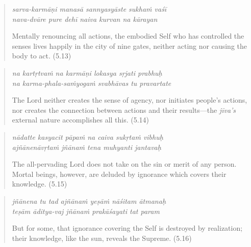 \documentclass[12pt, twoside, openright]{memoir}
\begin{document}
\par
\begin{verse}
\textit{sarva-karmāṇi manasā sannyasyāste sukhaṁ vaśī} \\
\textit{nava-dvāre pure dehī naiva kurvan na kārayan}

\noindent Mentally renouncing all actions, the embodied Self who has controlled the senses lives happily in the city of nine gates, neither acting nor causing the body to act. (5.13)
\end{verse}
\par



\par
\begin{verse}
\textit{na kartṛtvaṁ na karmāṇi lokasya sṛjati prabhuḥ} \\
\textit{na karma-phala-saṁyogaṁ svabhāvas tu pravartate}

\noindent The Lord neither creates the sense of agency, nor initiates people’s actions, nor creates the connection between actions and their results---the \textit{jīva's} external nature accomplishes all this. (5.14)
\end{verse}
\par



\par
\begin{verse}
\textit{nādatte kasyacit pāpaṁ na caiva sukṛtaṁ vibhuḥ} \\
\textit{ajñānenāvṛtaṁ jñānaṁ tena muhyanti jantavaḥ}

\noindent The all-pervading Lord does not take on the sin or merit of any person. Mortal beings, however, are deluded by ignorance which covers their knowledge. (5.15)
\end{verse}
\par



\par
\begin{verse}
\textit{jñānena tu tad ajñānaṁ yeṣāṁ nāśitam ātmanaḥ} \\
\textit{teṣām āditya-vaj jñānaṁ prakāśayati tat param}

\noindent But for some, that ignorance covering the Self is destroyed by realization; their knowledge, like the sun, reveals the Supreme. (5.16)
\end{verse}
\par
\end{document}
